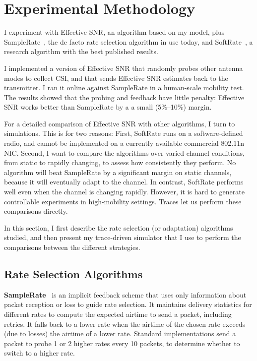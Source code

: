 \section{Experimental Methodology}
I experiment with Effective SNR, an algorithm based on my model, plus SampleRate~\cite{Bicket_SampleRate}, the de facto rate selection algorithm in use today, and SoftRate~\cite{Vutukuru_SoftRate}, a research algorithm with the best published results.

I implemented a version of Effective SNR that randomly probes other antenna modes to collect CSI, and that sends Effective SNR estimates back to the transmitter. I ran it online against SampleRate in a human-scale mobility test. The results showed that the probing and feedback have little penalty: Effective SNR works better than SampleRate by a a small (5\%--10\%) margin.

For a detailed comparison of Effective SNR with other algorithms, I turn to simulations. This is for two reasons: First, SoftRate runs on a software-defined radio, and cannot be implemented on a currently available commercial 802.11n NIC. Second, I want to compare the algorithms over varied channel conditions, from static to rapidly changing, to assess how consistently they perform. 
No algorithm will beat SampleRate by a significant margin on static channels, because it will eventually adapt to the channel. In contrast, SoftRate performs well even when the channel is changing rapidly. However, it is hard to generate controllable experiments in high-mobility settings. Traces let us perform these comparisons directly.

In this section, I first describe the rate selection (or adaptation) algorithms studied, and then present my trace-driven simulator that I use to perform the comparisons between the different strategies.

\subsection{Rate Selection Algorithms}
\textbf{SampleRate}~\cite{Bicket_SampleRate} is an implicit feedback scheme that uses only information about packet reception or loss to guide rate selection.
It maintains delivery statistics for different rates to compute the expected airtime to send a packet, including retries.
It falls back to a lower rate when the airtime of the chosen rate exceeds (due to losses) the airtime of a lower rate.
Standard implementations send a packet to probe 1 or 2 higher rates every 10 packets, to determine whether to switch to a higher rate.

